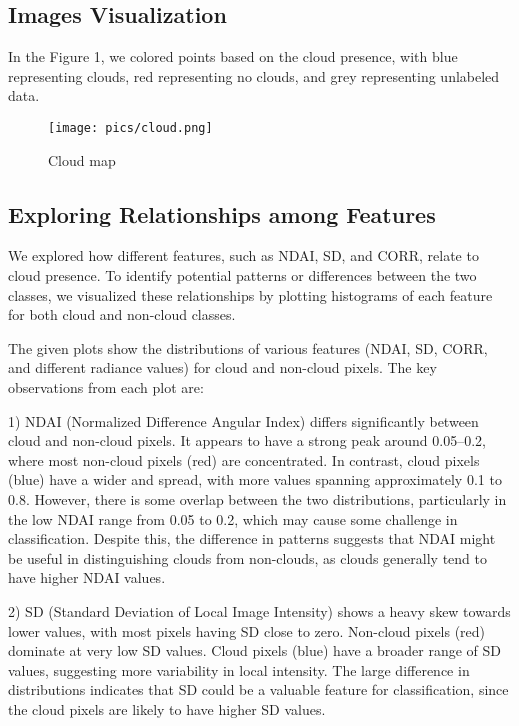 \documentclass[10pt,letterpaper]{article}
\begin{document}
\subsection{Images Visualization}

In the Figure 1, we colored points based on the cloud presence, with blue representing clouds, red representing no clouds, and grey representing unlabeled data. 

\begin{figure}[h!]
    \centering
    \texttt{[image: pics/cloud.png]}  
    \label{fig:cloudmap}
    \caption{Cloud map}
\end{figure}

\subsection{Exploring Relationships among Features}

We explored how different features, such as NDAI, SD, and CORR, relate to cloud presence. To identify potential patterns or differences between the two classes, we visualized these relationships by plotting histograms of each feature for both cloud and non-cloud classes. 

The given plots show the distributions of various features (NDAI, SD, CORR, and different radiance values) for cloud and non-cloud pixels. The key observations from each plot are:

1) NDAI (Normalized Difference Angular Index) differs significantly between cloud and non-cloud pixels. It appears to have a strong peak around 0.05–0.2, where most non-cloud pixels (red) are concentrated. In contrast, cloud pixels (blue) have a wider and spread, with more values spanning approximately 0.1 to 0.8. However, there is some overlap between the two distributions, particularly in the low NDAI range from 0.05 to 0.2, which may cause some challenge in classification. Despite this, the difference in patterns suggests that NDAI might be useful in distinguishing clouds from non-clouds, as clouds generally tend to have higher NDAI values.

2) SD (Standard Deviation of Local Image Intensity) shows a heavy skew towards lower values, with most pixels having SD close to zero.  Non-cloud pixels (red) dominate at very low SD values. Cloud pixels (blue) have a broader range of SD values, suggesting more variability in local intensity. The large difference in distributions indicates that SD could be a valuable feature for classification, since the cloud pixels are likely to have higher SD values.
\end{document}
